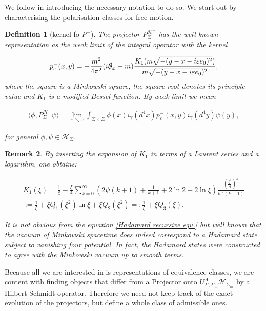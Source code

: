 \documentclass[b5paper,draft,openbib,12pt]{memoir}
\newtheorem{Def}{Definition}
\newtheorem{Remark}[Def]{Remark}
\begin{document}
We follow \cite{ivp2} in introducing the necessary 
notation to do so.
We start out by characterising the polarisation classes for free motion.
\begin{Def}[kernel fo \(P^-\)]
The projector \(P^{\mathcal{H}^-}_{\Sigma} \) has the well known representation 
as the weak limit of the integral operator 
with the kernel\cite{ivp2}

\begin{equation}
p^-_\varepsilon(x,y)= -\frac{m^2}{4\pi^2}(i\slashed{\partial}_x+m) \frac{K_1(m \sqrt{-(y-x-i \varepsilon e_0)^2})}{m \sqrt{-(y-x-i \varepsilon e_0)^2}},
\end{equation}
where the square is a Minkowski square, the 
square root denotes its principle value and 
\(K_1\) is a modified Bessel function. By weak 
limit we mean

\begin{align}
\langle \phi, P^{\mathcal{H}^-}_{\Sigma} \psi\rangle = \lim_{\varepsilon \searrow 0} \int_{\Sigma\times \Sigma} \overline{\phi}(x) i_\gamma(d^4x) p^-_\varepsilon(x,y ) i_\gamma(d^4y) \psi(y),
\end{align}

for general \(\phi, \psi \in \mathcal{H}_\Sigma\).
\end{Def}

\begin{Remark}
By inserting the expansion of \(K_1\) in terms of a Laurent series and a 
logarithm, \cite{abramowitz1965handbook} one obtains:

\begin{align}\label{K1series}
K_1(\xi) = \frac{1}{\xi}- \frac{\xi}{4} \sum_{k=0}^\infty \left(2 \psi(k+1)+\frac{1}{k+1}+2\ln 2 -2 \ln \xi \right) \frac{\left(\frac{\xi^2}{4}\right)^k}{k!^2 (k+1)}\\\label{def:Q}
:=\frac{1}{\xi} + \xi Q_1(\xi^2) \ln \xi +\xi Q_2(\xi^2)=:\frac{1}{\xi} + \xi Q_3(\xi).
\end{align}

It is not obvious from the equation \eqref{Hadamard recursive equ.} but well known that the
  vacuum of Minkowski spacetime does indeed
correspond to  a Hadamard state subject to vanishing four potential. In fact, the Hadamard states were constructed to 
agree with the Minkowski vacuum up to smooth terms.
\end{Remark}




Because all we are interested in is representations of 
equivalence classes, we are content with finding
objects that differ from a Projector onto 
\(U_{\Sigma,\Sigma_{\text{in}}}^A \mathcal{H}_{\Sigma_{in}}^-\) 
by a Hilbert-Schmidt operator.
Therefore we need not keep track of the exact evolution of 
the projectors, but define a whole class of admissible ones.
\end{document}
